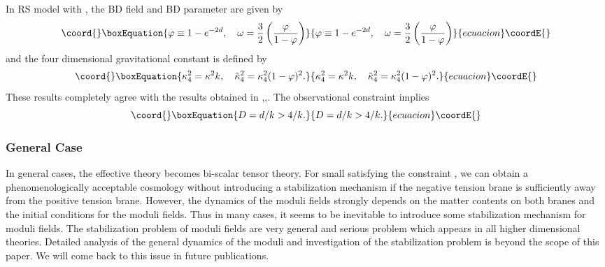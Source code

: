 \documentclass[a4paper,11pt]{article}
\begin{document}
In RS model with \coordHE{}, the BD field and BD parameter are 
given by
\begin{equation}\coord{}\boxEquation{
\varphi \equiv 1-e^{-2d},\quad \omega=\frac{3}{2} 
\left( \frac{\varphi}{1-\varphi} \right)
}{
\varphi \equiv 1-e^{-2d},\quad \omega=\frac{3}{2} 
\left( \frac{\varphi}{1-\varphi} \right)
}{ecuacion}\coordE{}\end{equation}
and the four dimensional gravitational constant is defined by 
\begin{equation}\coord{}\boxEquation{
\kappa_4^2= \kappa^2 k,\quad \tilde{\kappa}_4^2=\kappa_4^2 (1-\varphi)^2.
}{
\kappa_4^2= \kappa^2 k,\quad \tilde{\kappa}_4^2=\kappa_4^2 (1-\varphi)^2.
}{ecuacion}\coordE{}\end{equation}
These results completely agree with the results obtained in 
\cite{Kanno1},\cite{Kanno2},\cite{GT}. The observational constraint implies
\begin{equation}\coord{}\boxEquation{
D= d /k > 4 /k. 
}{
D= d /k > 4 /k. 
}{ecuacion}\coordE{}\end{equation}

\subsubsection{General Case}
In general cases, the effective theory becomes bi-scalar tensor
theory. For small \coordHE{} satisfying the constraint \coordHE{}, 
we can obtain a phenomenologically acceptable cosmology without introducing a
stabilization mechanism if the negative tension brane is sufficiently
away from the positive tension brane. However, the dynamics of the moduli 
fields strongly depends on the matter contents on both branes and the initial 
conditions for the moduli fields. Thus in many cases, it seems to be inevitable
to introduce some stabilization mechanism for moduli fields. The 
stabilization problem of moduli fields are very general and serious 
problem which appears in all higher dimensional theories. Detailed 
analysis of the general dynamics of the moduli and investigation of the 
stabilization problem is beyond the scope of this paper. We will come
back to this issue in future publications\cite{KK2}.
\end{document}
